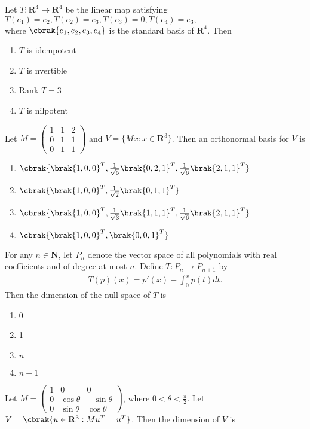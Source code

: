 \item Let $T : \mathbf{R}^4 \to \mathbf{R}^4$ be the linear map satisfying
\\$
T(e_1) = e_2, T(e_2) = e_3, T(e_3) = 0, T(e_4) = e_3,
$\\
where $\cbrak{e_1, e_2, e_3, e_4}$ is the standard basis of $\mathbf{R}^4$. Then
    \begin{enumerate}
        \item $T$ is idempotent
        \item $T$ is nvertible
        \item Rank $T = 3$
        \item $T$ is nilpotent
    \end{enumerate}
\item Let $M = \begin{pmatrix}
1 & 1 & 2 \\
0 & 1 & 1 \\
0 & 1 & 1
\end{pmatrix}$ and $V = \{ Mx : x \in \mathbf{R}^3 \}$. Then an orthonormal basis for $V$ is
\begin{enumerate}
    \item $\cbrak{\brak{1, 0, 0}^T, \frac{1}{\sqrt{5}}\brak{0, 2, 1}^T, \frac{1}{\sqrt{6}}\brak{2, 1, 1}^T}$
    \item $\cbrak{\brak{1, 0, 0}^T, \frac{1}{\sqrt{2}}\brak{0, 1, 1}^T}$
    \item $\cbrak{\brak{1, 0, 0}^T, \frac{1}{\sqrt{3}}\brak{1, 1, 1}^T, \frac{1}{\sqrt{6}}\brak{2, 1, 1}^T}$
    \item $\cbrak{\brak{1, 0, 0}^T, \brak{0, 0, 1}^T}$
\end{enumerate}
\item For any $n \in \mathbf{N}$, let $P_n$ denote the vector space of all polynomials with real coefficients and of degree at most $n$. Define $T: P_n \rightarrow P_{n+1}$ by
\begin{align*}
T(p)(x) = p'(x) - \int_0^x p(t) dt.
\end{align*}
Then the dimension of the null space of $T$ is

\begin{enumerate}
    \item 0
    \item 1
    \item $n$
    \item $n+1$
\end{enumerate}
\item Let $M = \begin{pmatrix}
1 & 0 & 0 \\
0 & \cos \theta & -\sin \theta \\
0 & \sin \theta & \cos \theta
\end{pmatrix}$, where $0 < \theta < \frac{\pi}{2}$. Let $V = \cbrak{ u \in \mathbf{R}^3 : M u^T = u^T }$. Then the dimension of $V$ is

